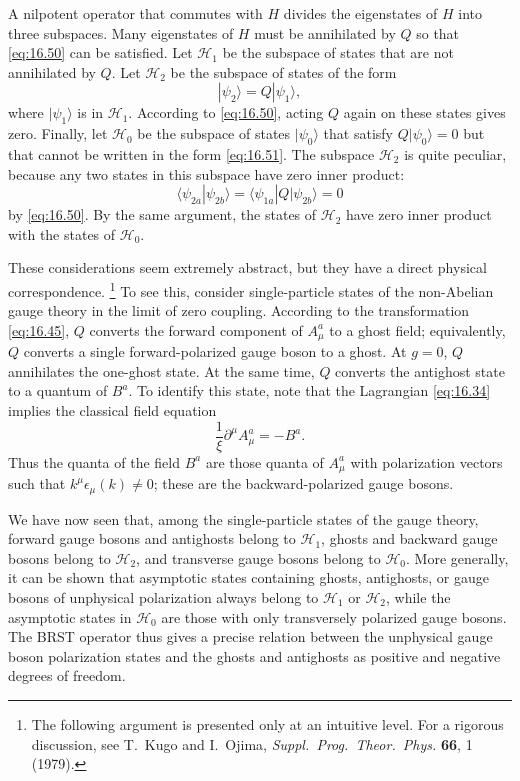 A nilpotent operator that commutes with $H$ divides the eigenstates of $H$
into three subspaces.  Many eigenstates of $H$ must be annihilated by $Q$ so
that \eqref{eq:16.50} can be satisfied.  Let $\mathcal{H}_1$ be the subspace
of states that are not annihilated by $Q$.  Let $\mathcal{H}_2$ be the
subspace of states of the form
\begin{equation}
  |\psi_2\rangle = Q|\psi_1\rangle ,
  \label{eq:16.51}
\end{equation}
where $|\psi_1\rangle$ is in $\mathcal{H}_1$.  According to \eqref{eq:16.50},
acting $Q$ again on these states gives zero.  Finally, let $\mathcal{H}_0$ be
the subspace of states $|\psi_0\rangle$ that satisfy $Q|\psi_0\rangle = 0$
but that cannot be written in the form \eqref{eq:16.51}.  The subspace
$\mathcal{H}_2$ is quite peculiar, because any two states in this subspace
have zero inner product:
\begin{equation}
  \langle\psi_{2a}|\psi_{2b}\rangle = \langle\psi_{1a}|Q|\psi_{2b}\rangle
  = 0
  \label{eq:16.52}
\end{equation}
by \eqref{eq:16.50}.  By the same argument, the states of $\mathcal{H}_2$
have zero inner product with the states of $\mathcal{H}_0$.

These considerations seem extremely abstract, but they have a direct physical
correspondence.%
\footnote{The following argument is presented only at an intuitive level.
For a rigorous discussion, see T.~Kugo and I.~Ojima, \emph{Suppl.\ Prog.\
Theor.\ Phys.} \textbf{66}, 1 (1979).}  To see this, consider single-particle
states of the non-Abelian gauge theory in the limit of zero coupling.
According to the transformation \eqref{eq:16.45}, $Q$ converts the forward
component of $A^a_\mu$ to a ghost field; equivalently, $Q$ converts a single
forward-polarized gauge boson to a ghost.  At $g = 0$, $Q$ annihilates the
one-ghost state.  At the same time, $Q$ converts the antighost state to a
quantum of $B^a$.  To identify this state, note that the Lagrangian
\eqref{eq:16.34} implies the classical field equation
\begin{equation}
  \frac{1}{\xi}\partial^\mu A^a_\mu = -B^a .
  \label{eq:16.53}
\end{equation}
Thus the quanta of the field $B^a$ are those quanta of $A^a_\mu$ with
polarization vectors such that $k^\mu\epsilon_\mu(k) \neq 0$; these are the
backward-polarized gauge bosons.

We have now seen that, among the single-particle states of the gauge theory,
forward gauge bosons and antighosts belong to $\mathcal{H}_1$, ghosts and
backward gauge bosons belong to $\mathcal{H}_2$, and transverse gauge bosons
belong to $\mathcal{H}_0$.  More generally, it can be shown that asymptotic
states containing ghosts, antighosts, or gauge bosons of unphysical
polarization always belong to $\mathcal{H}_1$ or $\mathcal{H}_2$, while the
asymptotic states in $\mathcal{H}_0$ are those with only transversely
polarized gauge bosons.  The BRST operator thus gives a precise relation
between the unphysical gauge boson polarization states and the ghosts and
antighosts as positive and negative degrees of freedom.

